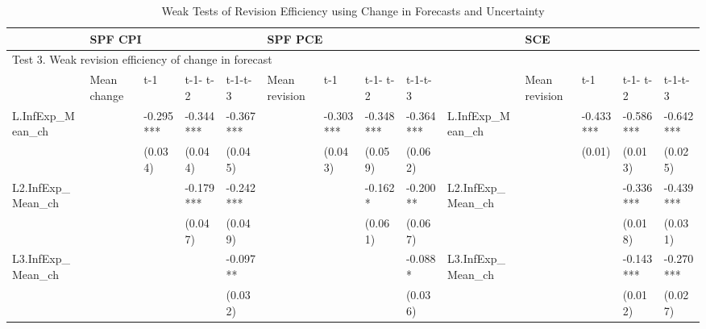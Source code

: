 \documentclass[12pt]{article}
\begin{document}
	
	\begin{table}
		\begin{adjustbox}{width={24cm},totalheight={14cm}}
			\begin{threeparttable}
				\caption{Weak Tests of Revision Efficiency using Change in Forecasts and Uncertainty}
				\label{WeakRevEfficiency}
				\begin{tabular}{llllllllllllll}
					\hline 
					& \multicolumn{4}{l}{SPF CPI}                     & \multicolumn{4}{l}{SPF PCE}                       &                      & \multicolumn{4}{l}{SCE}                           \\
					\hline 
					\multicolumn{14}{l}{Test 3. Weak revision efficiency of change in forecast}                                                                                                                                    \\
					\hline 
					& Mean change & t-1       & t-1- t-2  & t-1-t-3   & Mean revision & t-1       & t-1- t-2  & t-1-t-3   &                      & Mean revision & t-1       & t-1- t-2  & t-1-t-3   \\
					\hline 
					L.InfExp\_Mean\_ch   &             & -0.295*** & -0.344*** & -0.367*** &               & -0.303*** & -0.348*** & -0.364*** & L.InfExp\_Mean\_ch  &         & -0.433*** & -0.586*** & -0.642*** \\
					&             & (0.034)   & (0.044)   & (0.045)   &               & (0.043)   & (0.059)   & (0.062)   &                    &         & (0.01)     & (0.013)    & (0.025)    \\
					
					L2.InfExp\_Mean\_ch  &             &           & -0.179*** & -0.242*** &               &           & -0.162*   & -0.200**  & L2.InfExp\_Mean\_ch &         &           & -0.336*** & -0.439*** \\
					
					&             &           & (0.047)   & (0.049)   &               &           & (0.061)   & (0.067)   &                                   &         &           & (0.018)    & (0.031)    \\
					L3.InfExp\_Mean\_ch  &             &           &           & -0.097**  &               &           &           & -0.088*   & L3.InfExp\_Mean\_ch &         &           & -0.143*** & -0.270*** \\
					
					&             &           &           & (0.032)   &               &           &           & (0.036)   &                                &         &           & (0.012)    & (0.027)    \\
					

\end{tabular}
\end{threeparttable}
\end{adjustbox}
\end{table}
\end{document}
